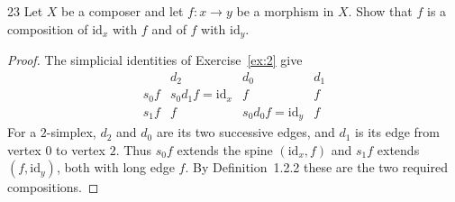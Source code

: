 \begin{exercise}{23}
Let $X$ be a composer and let $f\colon x\to y$ be a morphism in $X$.
Show that $f$ is a composition of $\mathrm{id}_x$ with $f$ and of
$f$ with $\mathrm{id}_y$.

\begin{proof}
The simplicial identities of Exercise~\ref{ex:2} give
\[
 \begin{array}{c|ccc}
       & d_2 & d_0 & d_1 \\
  s_0f & s_0d_1f=\mathrm{id}_x & f & f \\
  s_1f & f & s_0d_0f=\mathrm{id}_y & f
 \end{array}
\]
For a $2$-simplex, $d_2$ and $d_0$ are its two successive edges,
and $d_1$ is its edge from vertex $0$ to vertex $2$.
Thus $s_0f$ extends the spine $(\mathrm{id}_x,f)$ and $s_1f$
extends $(f,\mathrm{id}_y)$, both with long edge $f$.
By Definition~1.2.2 these are the two required compositions.
\end{proof}
\end{exercise}
